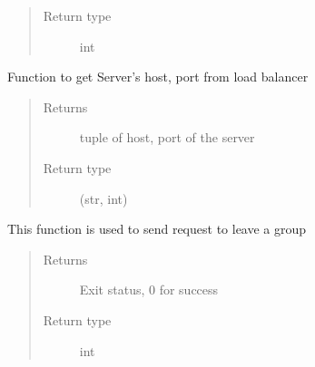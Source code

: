 \documentclass[letterpaper,10pt,english]{sphinxmanual}
\begin{document}
\begin{fulllineitems}
\begin{fulllineitems}
\begin{quote}
\begin{description}
\item[{Return type}] \leavevmode
int

\end{description}\end{quote}

\end{fulllineitems}


\begin{fulllineitems}
\label{\detokenize{Message:Message.Message._get_server_from_lb}}
Function to get Server’s host, port from load balancer
\begin{quote}\begin{description}
\item[{Returns}] \leavevmode
tuple of host, port of the server

\item[{Return type}] \leavevmode
(str, int)

\end{description}\end{quote}

\end{fulllineitems}


\begin{fulllineitems}
\label{\detokenize{Message:Message.Message._leave_grp}}
This function is used to send request to leave a group
\begin{quote}\begin{description}
\item[{Returns}] \leavevmode
Exit status, 0 for success

\item[{Return type}] \leavevmode
int

\end{description}\end{quote}

\end{fulllineitems}



\end{fulllineitems}
\end{document}
